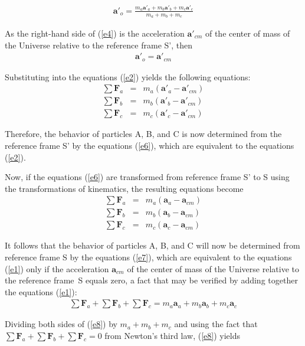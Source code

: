 \documentclass[12pt]{article}
\newcommand{\vA}{\mathbf{a}}
\newcommand{\vF}{\mathbf{F}}
\newcommand{\mM}{m}
\newcommand{\rt}{'}
\newcommand{\ra}{_a}
\newcommand{\rb}{_b}
\newcommand{\rc}{_c}
\newcommand{\ro}{_o}
\newcommand{\rcm}{_{cm}}
\begin{document}
\begin{eqnarray}
\vA\rt\ro = \frac{\mM\ra\vA\rt\ra + \mM\rb\vA\rt\rb + \mM\rc\vA\rt\rc}{\mM\ra + \mM\rb + \mM\rc} \label{e4}
\end{eqnarray}
\par As the right-hand side of (\ref{e4}) is the acceleration $\vA\rt\rcm$ of the center of mass of the Universe relative to the reference frame S', then
\begin{eqnarray}
\vA\rt\ro = \vA\rt\rcm \label{e5}
\end{eqnarray}
\par Substituting into the equations (\ref{e2}) yields the following equations:
\begin{eqnarray}
\sum \vF\ra & = & \mM\ra(\vA\rt\ra - \vA\rt\rcm) \nonumber \\
\sum \vF\rb & = & \mM\rb(\vA\rt\rb - \vA\rt\rcm) \label{e6} \\
\sum \vF\rc & = & \mM\rc(\vA\rt\rc - \vA\rt\rcm) \nonumber
\end{eqnarray}
\par Therefore, the behavior of particles A, B, and C is now determined from the reference frame S' by the equations (\ref{e6}), which are equivalent to the equations (\ref{e2}).
\par Now, if the equations (\ref{e6}) are transformed from reference frame S' to S using the transformations of kinematics, the resulting equations become
\begin{eqnarray}
\sum \vF\ra & = & \mM\ra(\vA\ra - \vA\rcm) \nonumber \\
\sum \vF\rb & = & \mM\rb(\vA\rb - \vA\rcm) \label{e7} \\
\sum \vF\rc & = & \mM\rc(\vA\rc - \vA\rcm) \nonumber
\end{eqnarray}
\par It follows that the behavior of particles A, B, and C will now be determined from reference frame S by the equations (\ref{e7}), which are equivalent to the equations (\ref{e1}) only if the acceleration $\vA\rcm$ of the center of mass of the Universe relative to the reference \hbox {frame S} equals zero, a fact that may be verified by adding together the equations (\ref{e1}):
\begin{eqnarray}
\sum \vF\ra + \sum \vF\rb + \sum \vF\rc = \mM\ra\vA\ra + \mM\rb\vA\rb + \mM\rc\vA\rc \label{e8}
\end{eqnarray}
\par Dividing both sides of (\ref{e8}) by $\mM\ra + \mM\rb + \mM\rc$ and using the fact that $\sum \vF\ra + \sum \vF\rb + \sum \vF\rc = 0$ from Newton's third law, (\ref{e8}) yields
\end{document}
